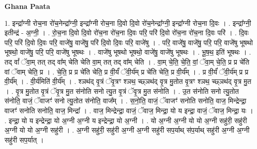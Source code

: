 \documentclass[17pt]{extarticle}
\begin{document}
\textbf{Ghana Paata } \newline

1. इन्द्रा᳚ग्नी रोच॒ना रो॑च॒नेन्द्रा᳚ग्नी॒ इन्द्रा᳚ग्नी रोच॒ना दि॒वो दि॒वो रो॑च॒नेन्द्रा᳚ग्नी॒ इन्द्रा᳚ग्नी रोच॒ना दि॒वः । . इन्द्रा᳚ग्नी॒ इतीन्द्र॑ - अ॒ग्नी॒ । . रो॒च॒ना दि॒वो दि॒वो रो॑च॒ना रो॑च॒ना दि॒वः परि॒ परि॑ दि॒वो रो॑च॒ना रो॑च॒ना दि॒वः परि॑ । . दि॒वः परि॒ परि॑ दि॒वो दि॒वः परि॒ वाजे॑षु॒ वाजे॑षु॒ परि॑ दि॒वो दि॒वः परि॒ वाजे॑षु । . परि॒ वाजे॑षु॒ वाजे॑षु॒ परि॒ परि॒ वाजे॑षु भूषथो भूषथो॒ वाजे॑षु॒ परि॒ परि॒ वाजे॑षु भूषथः । . वाजे॑षु भूषथो भूषथो॒ वाजे॑षु॒ वाजे॑षु भूषथः । . भू॒ष॒थ॒ इति॑ भूषथः । . तद् वां᳚ ॅवा॒म् तत् तद् वा᳚म् चेति चेति वा॒म् तत् तद् वा᳚म् चेति । . वा॒म् चे॒ति॒ चे॒ति॒ वां॒ ॅवा॒म् चे॒ति॒ प्र प्र चे॑ति वां ॅवाम् चेति॒ प्र । . चे॒ति॒ प्र प्र चे॑ति चेति॒ प्र वी॒र्यं॑ ॅवी॒र्य॑म् प्र चे॑ति चेति॒ प्र वी॒र्य᳚म् । . प्र वी॒र्यं॑ ॅवी॒र्य॑म् प्र प्र वी॒र्य᳚म् । . वी॒र्य॑मिति॑ वी॒र्य᳚म् । . श्ञथ॑द् वृ॒त्रं ॅवृ॒त्रꣳ श्ञथ॒ च्छ्ञथ॑द् वृ॒त्र मु॒तोत वृ॒त्रꣳ श्ञथ॒ च्छ्ञथ॑द् वृ॒त्र मु॒त । . वृ॒त्र मु॒तोत वृ॒त्रं ॅवृ॒त्र मु॒त स॑नोति सनो त्यु॒त वृ॒त्रं ॅवृ॒त्र मु॒त स॑नोति । . उ॒त स॑नोति सनो त्यु॒तोत स॑नोति॒ वाजं॒ ॅवाजꣳ॑ सनो त्यु॒तोत स॑नोति॒ वाज᳚म् । . स॒नो॒ति॒ वाजं॒ ॅवाजꣳ॑ सनोति सनोति॒ वाज॒ मिन्द्रेन्द्रा॒ वाजꣳ॑ सनोति सनोति॒ वाज॒ मिन्द्रा᳚ । . वाज॒ मिन्द्रेन्द्रा॒ वाजं॒ ॅवाज॒ मिन्द्रा॒ यो य इन्द्रा॒ वाजं॒ ॅवाज॒ मिन्द्रा॒ यः । . इन्द्रा॒ यो य इन्द्रेन्द्रा॒ यो अ॒ग्नी अ॒ग्नी य इन्द्रेन्द्रा॒ यो अ॒ग्नी । . यो अ॒ग्नी अ॒ग्नी यो यो अ॒ग्नी सहु॑री॒ सहु॑री अ॒ग्नी यो यो अ॒ग्नी सहु॑री । . अ॒ग्नी सहु॑री॒ सहु॑री अ॒ग्नी अ॒ग्नी सहु॑री सप॒र्याथ् स॑प॒र्याथ् सहु॑री अ॒ग्नी अ॒ग्नी सहु॑री सप॒र्यात् । \newline
\end{document}
